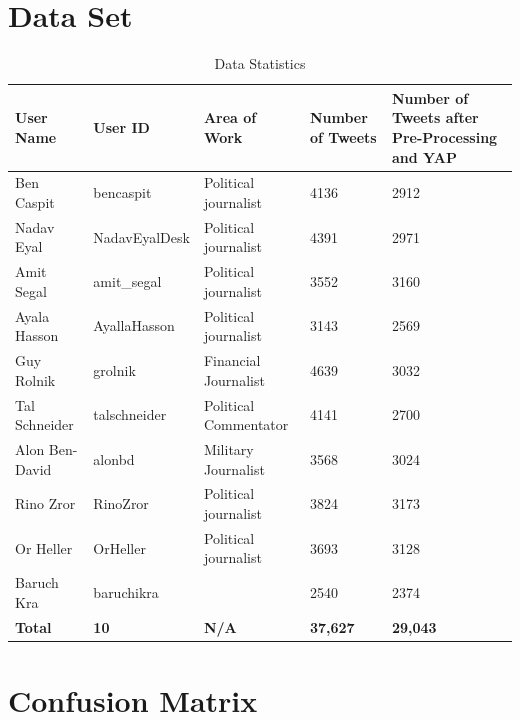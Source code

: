 \documentclass[a4paper]{article}
\begin{document}
\clearpage
\onecolumn
\begin{appendices}
\section{Data Set}
\label{apx:data set}
\begin{table}[htbp]
	\centering
		\begin{tabular}{| l | l | l | l | p{4cm} |}
		\hline
		\textbf{User Name} & \textbf{User ID} & \textbf{Area of Work} & \textbf{Number of Tweets} & \textbf{Number of Tweets after Pre-Processing and YAP} \\ \hline
    Ben Caspit & bencaspit & Political journalist & 4136  & 2912 \\ \hline
    Nadav Eyal & NadavEyalDesk & Political journalist & 4391  & 2971 \\ \hline
    Amit Segal & amit\_segal & Political journalist & 3552  & 3160 \\ \hline
    Ayala Hasson & AyallaHasson & Political journalist & 3143  & 2569 \\ \hline
    Guy Rolnik & grolnik & Financial Journalist & 4639  & 3032 \\ \hline
    Tal Schneider & talschneider & Political Commentator & 4141  & 2700 \\ \hline
    Alon Ben-David & alonbd & Military Journalist & 3568  & 3024 \\ \hline
    Rino Zror & RinoZror & Political journalist & 3824  & 3173 \\ \hline
    Or Heller & OrHeller & Political journalist & 3693  & 3128 \\ \hline
    Baruch Kra & baruchikra &  & 2540  & 2374 \\ \hline
	\textbf{Total} & \textbf{10} & \textbf{N/A} & \textbf{37,627} & \textbf{29,043} \\ \hline
\end{tabular}
\caption{Data Statistics}
\label{tab:datastats}%
\end{table}

\section{Confusion Matrix}
\label{apx:confusion matrix}


\end{appendices}
\end{document}
